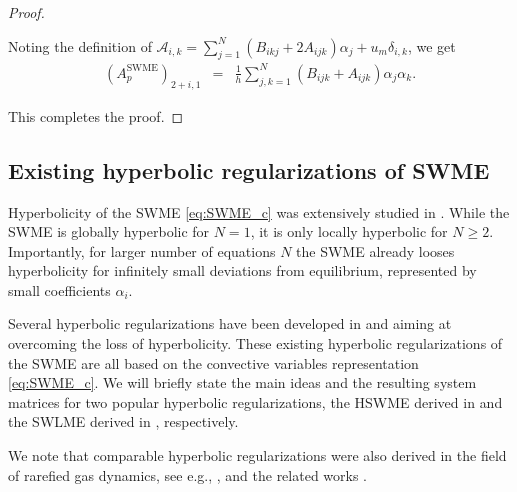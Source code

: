\documentclass[a4paper, 11pt]{article}
\begin{document}
\begin{proof}
\begin{itemize}
        Noting the definition of $\mathcal{A}_{i,k} = \sum\limits_{j=1}^{N} \left( B_{ikj} + 2 A_{ijk} \right) \alpha_j + u_m \delta_{i,k}$, we get
        \begin{eqnarray}
            (A^{\textrm{SWME}}_p)_{2+i,1} &=& \frac{1}{h}\sum\limits_{j,k=1}^{N} \left(B_{ijk} + A_{ijk} \right) \alpha_j \alpha_k.
        \end{eqnarray}
    \end{itemize}
    This completes the proof.
\end{proof}


\subsection{Existing hyperbolic regularizations of SWME}
Hyperbolicity of the SWME \eqref{eq:SWME_c} was extensively studied in \cite{Koellermeier2020c}. While the SWME is globally hyperbolic for $N=1$, it is only locally hyperbolic for $N\geq 2$. Importantly, for larger number of equations $N$ the SWME already looses hyperbolicity for infinitely small deviations from equilibrium, represented by small coefficients $\alpha_i$.

Several hyperbolic regularizations have been developed in \cite{Koellermeier2020c} and \cite{Koellermeier2020i} aiming at overcoming the loss of hyperbolicity.
These existing hyperbolic regularizations of the SWME are all based on the convective variables representation \eqref{eq:SWME_c}. We will briefly state the main ideas and the resulting system matrices for two popular hyperbolic regularizations, the HSWME derived in \cite{Koellermeier2020c} and the SWLME derived in \cite{Koellermeier2020i}, respectively.

We note that comparable hyperbolic regularizations were also derived in the field of rarefied gas dynamics, see e.g., \cite{Cai2012a,Cai2013b,Cai2014a,Fan2016}, and the related works \cite{Schaerer2015,McDonald2013}.
\end{document}

